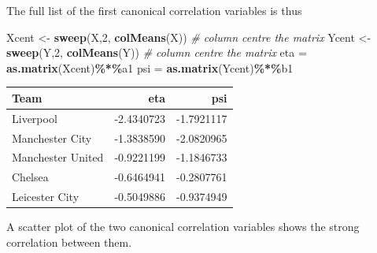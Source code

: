 \documentclass[
]{book}
\newenvironment{Shaded}{\begin{snugshade}}{\end{snugshade}}
\newcommand{\AttributeTok}[1]{\textcolor[rgb]{0.13,0.29,0.53}{#1}}
\newcommand{\CommentTok}[1]{\textcolor[rgb]{0.56,0.35,0.01}{\textit{#1}}}
\newcommand{\DecValTok}[1]{\textcolor[rgb]{0.00,0.00,0.81}{#1}}
\newcommand{\FunctionTok}[1]{\textcolor[rgb]{0.13,0.29,0.53}{\textbf{#1}}}
\newcommand{\NormalTok}[1]{#1}
\newcommand{\OtherTok}[1]{\textcolor[rgb]{0.56,0.35,0.01}{#1}}
\newcommand{\SpecialCharTok}[1]{\textcolor[rgb]{0.81,0.36,0.00}{\textbf{#1}}}
\theoremstyle{definition}
\theoremstyle{definition}
\theoremstyle{definition}
\theoremstyle{definition}
\theoremstyle{remark}
\begin{document}
The full list of the first canonical correlation variables is thus

\begin{Shaded}
\begin{Highlighting}[]
\NormalTok{Xcent }\OtherTok{\textless{}{-}} \FunctionTok{sweep}\NormalTok{(X,}\DecValTok{2}\NormalTok{, }\FunctionTok{colMeans}\NormalTok{(X)) }\CommentTok{\# column centre the matrix}
\NormalTok{Ycent }\OtherTok{\textless{}{-}} \FunctionTok{sweep}\NormalTok{(Y,}\DecValTok{2}\NormalTok{, }\FunctionTok{colMeans}\NormalTok{(Y)) }\CommentTok{\# column centre the matrix}
\NormalTok{eta }\OtherTok{=} \FunctionTok{as.matrix}\NormalTok{(Xcent)}\SpecialCharTok{\%*\%}\NormalTok{a1}
\NormalTok{psi }\OtherTok{=} \FunctionTok{as.matrix}\NormalTok{(Ycent)}\SpecialCharTok{\%*\%}\NormalTok{b1}
\end{Highlighting}
\end{Shaded}

\begin{tabular}{lrr}
\toprule
Team & eta & psi\\
\midrule
Liverpool & -2.4340723 & -1.7921117\\
Manchester City & -1.3838590 & -2.0820965\\
Manchester United & -0.9221199 & -1.1846733\\
Chelsea & -0.6464941 & -0.2807761\\
Leicester City & -0.5049886 & -0.9374949\\
\bottomrule
\end{tabular}

A scatter plot of the two canonical correlation variables shows the strong correlation between them.

\begin{Shaded}
\end{Shaded}
\end{document}

